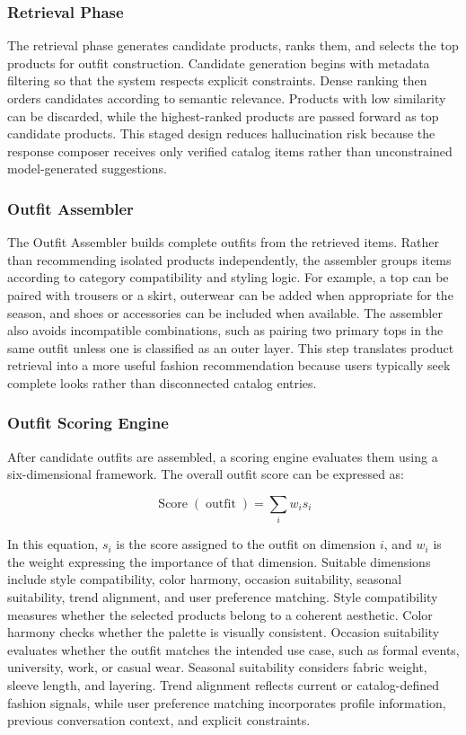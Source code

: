 \subsubsection*{Retrieval Phase}
The retrieval phase generates candidate products, ranks them, and selects the top products for outfit construction. Candidate generation begins with metadata filtering so that the system respects explicit constraints. Dense ranking then orders candidates according to semantic relevance. Products with low similarity can be discarded, while the highest-ranked products are passed forward as top candidate products. This staged design reduces hallucination risk because the response composer receives only verified catalog items rather than unconstrained model-generated suggestions.

\subsubsection*{Outfit Assembler}
The Outfit Assembler builds complete outfits from the retrieved items. Rather than recommending isolated products independently, the assembler groups items according to category compatibility and styling logic. For example, a top can be paired with trousers or a skirt, outerwear can be added when appropriate for the season, and shoes or accessories can be included when available. The assembler also avoids incompatible combinations, such as pairing two primary tops in the same outfit unless one is classified as an outer layer. This step translates product retrieval into a more useful fashion recommendation because users typically seek complete looks rather than disconnected catalog entries.

\subsubsection*{Outfit Scoring Engine}
After candidate outfits are assembled, a scoring engine evaluates them using a six-dimensional framework. The overall outfit score can be expressed as:

\begin{equation}
\operatorname{Score}(\operatorname{outfit}) = \sum_i w_i s_i
\end{equation}

In this equation, \(s_i\) is the score assigned to the outfit on dimension \(i\), and \(w_i\) is the weight expressing the importance of that dimension. Suitable dimensions include style compatibility, color harmony, occasion suitability, seasonal suitability, trend alignment, and user preference matching. Style compatibility measures whether the selected products belong to a coherent aesthetic. Color harmony checks whether the palette is visually consistent. Occasion suitability evaluates whether the outfit matches the intended use case, such as formal events, university, work, or casual wear. Seasonal suitability considers fabric weight, sleeve length, and layering. Trend alignment reflects current or catalog-defined fashion signals, while user preference matching incorporates profile information, previous conversation context, and explicit constraints.

